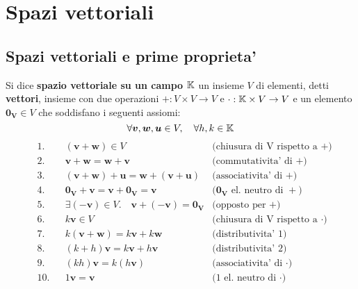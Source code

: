 \chapter{Spazi vettoriali}

\section{Spazi vettoriali e prime proprieta'}

\begin{definition}
    Si dice \textbf{spazio vettoriale su un campo $\mathbb{K}$} un insieme $V$ di elementi, detti \textbf{vettori}, insieme con due operazioni $+ : V \times V \to V$ e $\cdot : \mathbb{K} \times V \to V$ e un elemento $\bm{0_V} \in V$ che soddisfano i seguenti assiomi:
    \[\forall \bm{v}, \bm{w}, \bm{u} \in V, \quad\forall h, k \in \mathbb{K} \]
    \begin{align}
        &\text{1.} &&(\bm{v} + \bm{w}) \in V                                        &\text{(chiusura di V rispetto a $+$)} \\      
        &\text{2.} &&\bm{v} + \bm{w} = \bm{w} + \bm{v}                              &\text{(commutativita' di $+$)} \\
        &\text{3.} &&(\bm{v} + \bm{w}) + \bm{u} = \bm{w} + (\bm{v} + \bm{u})        &\text{(associativita' di $+$)} \\
        &\text{4.} &&\bm{0_V} + \bm{v} = \bm{v} + \bm{0_V} = \bm{v}                 &\text{($\bm{0_V}$ el. neutro di $+$)} \\
        &\text{5.} &&\exists (-\bm{v}) \in V. \quad\bm{v} + (\bm{-v}) = \bm{0_V}    &\text{(opposto per $+$)} \\
        &\text{6.} &&k\bm{v} \in V                                                  &\text{(chiusura di V rispetto a $\cdot$)} \\
        &\text{7.} &&k(\bm{v} + \bm{w}) = k\bm{v} + k\bm{w}                         &\text{(distributivita' 1)} \\
        &\text{8.} &&(k + h)\bm{v}= k\bm{v} + h\bm{v}                               &\text{(distributivita' 2)} \\
        &\text{9.} &&(kh)\bm{v}= k(h\bm{v})                                         &\text{(associativita' di $\cdot$)} \\
        &\text{10.}&&1\bm{v}= \bm{v}                                                &\text{(1 el. neutro di $\cdot$)}
    \end{align}
\end{definition}
 
